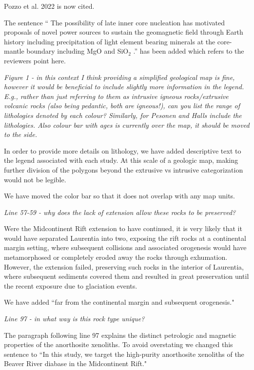 \documentclass[11pt, letterpaper]{article}
\begin{document}
\begin{flushleft}
Pozzo et al. 2022 is now cited.

The sentence `` The possibility of late inner core nucleation has motivated proposals of novel power sources to sustain the geomagnetic field through Earth history including precipitation of light element bearing minerals at the core-mantle boundary including MgO \cite{Badro2016a, ORourke2016b} and SiO$_2$ \cite{Mittal2020a}.'' has been added which refers to the reviewers point here.

\textit{Figure 1 - in this context I think providing a simplified geological map is fine, however it would be beneficial to include slightly more information in the legend. E.g., rather than just referring to them as intrusive igneous rocks/extrusive volcanic rocks (also being pedantic, both are igneous!), can you list the range of lithologies denoted by each colour? Similarly, for Pesonen and Halls include the lithologies. Also colour bar with ages is currently over the map, it should be moved to the side.}

In order to provide more details on lithology, we have added descriptive text to the legend associated with each study. At this scale of a geologic map, making further division of the polygons beyond the extrusive vs intrusive categorization would not be legible.

We have moved the color bar so that it does not overlap with any map units.

\textit{Line 57-59 - why does the lack of extension allow these rocks to be preserved?}

Were the Midcontinent Rift extension to have continued, it is very likely that it would have separated Laurentia into two, exposing the rift rocks at a continental margin setting, where subsequent collisions and associated orogenesis would have metamorphosed or completely eroded away the rocks through exhumation. However, the extension failed, preserving such rocks in the interior of Laurentia, where subsequent sediments covered them and resulted in great preservation until the recent exposure due to glaciation events.

We have added ``far from the continental margin and subsequent orogenesis."

\textit{Line 97 - in what way is this rock type unique?}

The paragraph following line 97 explains the distinct petrologic and magnetic properties of the anorthosite xenoliths. To avoid overstating we changed this sentence to ``In this study, we target the high-purity anorthosite xenoliths of the Beaver River diabase in the Midcontinent Rift." 


\end{flushleft}
\end{document}
